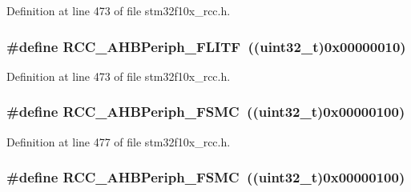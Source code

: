 Definition at line 473 of file stm32f10x\+\_\+rcc.\+h.

\subsubsection[{\texorpdfstring{R\+C\+C\+\_\+\+A\+H\+B\+Periph\+\_\+\+F\+L\+I\+TF}{RCC_AHBPeriph_FLITF}}]{\setlength{\rightskip}{0pt plus 5cm}\#define R\+C\+C\+\_\+\+A\+H\+B\+Periph\+\_\+\+F\+L\+I\+TF~(({\bf uint32\+\_\+t})0x00000010)}\hypertarget{group___a_h_b__peripheral_ga4277d70aa6b5e0b1ec6c8fb8180aac08}{}\label{group___a_h_b__peripheral_ga4277d70aa6b5e0b1ec6c8fb8180aac08}


Definition at line 473 of file stm32f10x\+\_\+rcc.\+h.

\subsubsection[{\texorpdfstring{R\+C\+C\+\_\+\+A\+H\+B\+Periph\+\_\+\+F\+S\+MC}{RCC_AHBPeriph_FSMC}}]{\setlength{\rightskip}{0pt plus 5cm}\#define R\+C\+C\+\_\+\+A\+H\+B\+Periph\+\_\+\+F\+S\+MC~(({\bf uint32\+\_\+t})0x00000100)}\hypertarget{group___a_h_b__peripheral_ga857dbf7044a974efb142c4450eafd609}{}\label{group___a_h_b__peripheral_ga857dbf7044a974efb142c4450eafd609}


Definition at line 477 of file stm32f10x\+\_\+rcc.\+h.

\subsubsection[{\texorpdfstring{R\+C\+C\+\_\+\+A\+H\+B\+Periph\+\_\+\+F\+S\+MC}{RCC_AHBPeriph_FSMC}}]{\setlength{\rightskip}{0pt plus 5cm}\#define R\+C\+C\+\_\+\+A\+H\+B\+Periph\+\_\+\+F\+S\+MC~(({\bf uint32\+\_\+t})0x00000100)}\hypertarget{group___a_h_b__peripheral_ga857dbf7044a974efb142c4450eafd609}{}\label{group___a_h_b__peripheral_ga857dbf7044a974efb142c4450eafd609}



